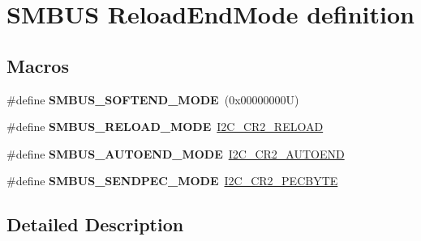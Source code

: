 \hypertarget{group___s_m_b_u_s___reload_end_mode__definition}{}\section{S\+M\+B\+US Reload\+End\+Mode definition}
\label{group___s_m_b_u_s___reload_end_mode__definition}
\subsection*{Macros}
\begin{DoxyCompactItemize}
\item 
\mbox{\label{group___s_m_b_u_s___reload_end_mode__definition_ga1560bbcd87332d27799d66609c7c3f72}} 
\#define {\bfseries S\+M\+B\+U\+S\+\_\+\+S\+O\+F\+T\+E\+N\+D\+\_\+\+M\+O\+DE}~(0x00000000\+U)
\item 
\mbox{\label{group___s_m_b_u_s___reload_end_mode__definition_ga3941c65ca2bfd12164b7239013f496b3}} 
\#define {\bfseries S\+M\+B\+U\+S\+\_\+\+R\+E\+L\+O\+A\+D\+\_\+\+M\+O\+DE}~\hyperlink{group___peripheral___registers___bits___definition_ga21a796045451013c964ef8b12ca6c9bb}{I2\+C\+\_\+\+C\+R2\+\_\+\+R\+E\+L\+O\+AD}
\item 
\mbox{\label{group___s_m_b_u_s___reload_end_mode__definition_gadf3a5b3d8adf01c0b80c08fa3f89f2ba}} 
\#define {\bfseries S\+M\+B\+U\+S\+\_\+\+A\+U\+T\+O\+E\+N\+D\+\_\+\+M\+O\+DE}~\hyperlink{group___peripheral___registers___bits___definition_gabcf789c74e217ec8967bcabc156a6c54}{I2\+C\+\_\+\+C\+R2\+\_\+\+A\+U\+T\+O\+E\+ND}
\item 
\mbox{\label{group___s_m_b_u_s___reload_end_mode__definition_ga22cdf561ca5299649b2f839fcae24dbe}} 
\#define {\bfseries S\+M\+B\+U\+S\+\_\+\+S\+E\+N\+D\+P\+E\+C\+\_\+\+M\+O\+DE}~\hyperlink{group___peripheral___registers___bits___definition_ga6989be2db6f3df41bf5cdb856b1a64c7}{I2\+C\+\_\+\+C\+R2\+\_\+\+P\+E\+C\+B\+Y\+TE}
\end{DoxyCompactItemize}


\subsection{Detailed Description}
